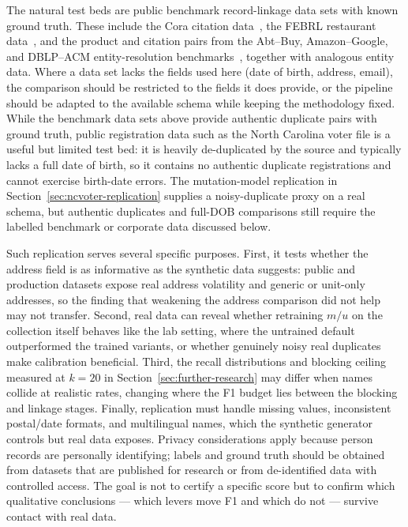 \documentclass[conference]{IEEEtran}
\begin{document}
The natural test beds are public benchmark record-linkage data sets with known ground truth. These include the Cora citation data~\cite{mccallum2000}, the FEBRL restaurant data~\cite{christen2004}, and the product and citation pairs from the Abt--Buy, Amazon--Google, and DBLP--ACM entity-resolution benchmarks~\cite{kopcke2010,mudgal2018}, together with analogous entity data. Where a data set lacks the fields used here (date of birth, address, email), the comparison should be restricted to the fields it does provide, or the pipeline should be adapted to the available schema while keeping the methodology fixed. While the benchmark data sets above provide authentic duplicate pairs with ground truth, public registration data such as the North Carolina voter file is a useful but limited test bed: it is heavily de-duplicated by the source and typically lacks a full date of birth, so it contains no authentic duplicate registrations and cannot exercise birth-date errors. The mutation-model replication in Section~\ref{sec:ncvoter-replication} supplies a noisy-duplicate proxy on a real schema, but authentic duplicates and full-DOB comparisons still require the labelled benchmark or corporate data discussed below.

Such replication serves several specific purposes. First, it tests whether the address field is as informative as the synthetic data suggests: public and production datasets expose real address volatility and generic or unit-only addresses, so the finding that weakening the address comparison did not help may not transfer. Second, real data can reveal whether retraining $m/u$ on the collection itself behaves like the lab setting, where the untrained default outperformed the trained variants, or whether genuinely noisy real duplicates make calibration beneficial. Third, the recall distributions and blocking ceiling measured at $k=20$ in Section~\ref{sec:further-research} may differ when names collide at realistic rates, changing where the F1 budget lies between the blocking and linkage stages. Finally, replication must handle missing values, inconsistent postal/date formats, and multilingual names, which the synthetic generator controls but real data exposes. Privacy considerations apply because person records are personally identifying; labels and ground truth should be obtained from datasets that are published for research or from de-identified data with controlled access. The goal is not to certify a specific score but to confirm which qualitative conclusions --- which levers move F1 and which do not --- survive contact with real data.
\end{document}
